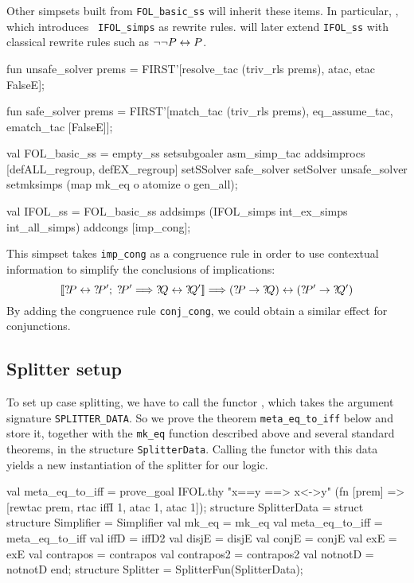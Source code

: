 Other simpsets built from \texttt{FOL_basic_ss} will inherit these items.
In particular, , which introduces {\tt
  IFOL_simps} as rewrite rules.   will later
extend \texttt{IFOL_ss} with classical rewrite rules such as $\lnot\lnot
P\leftrightarrow P$.
\begin{ttbox}
fun unsafe_solver prems = FIRST'[resolve_tac (triv_rls {\at} prems),
                                 atac, etac FalseE];

fun safe_solver prems = FIRST'[match_tac (triv_rls {\at} prems),
                               eq_assume_tac, ematch_tac [FalseE]];

val FOL_basic_ss = 
      empty_ss setsubgoaler asm_simp_tac
               addsimprocs [defALL_regroup, defEX_regroup]
               setSSolver   safe_solver
               setSolver  unsafe_solver
               setmksimps (map mk_eq o atomize o gen_all);

val IFOL_ss = 
      FOL_basic_ss addsimps (IFOL_simps {\at} 
                             int_ex_simps {\at} int_all_simps)
                   addcongs [imp_cong];
\end{ttbox}
This simpset takes \texttt{imp_cong} as a congruence rule in order to use
contextual information to simplify the conclusions of implications:
\[ \List{\Var{P}\bimp\Var{P'};\; \Var{P'} \Imp \Var{Q}\bimp\Var{Q'}} \Imp
   (\Var{P}\imp\Var{Q}) \bimp (\Var{P'}\imp\Var{Q'})
\]
By adding the congruence rule \texttt{conj_cong}, we could obtain a similar
effect for conjunctions.


\subsection{Splitter setup}

To set up case splitting, we have to call the \ML{} functor , which takes the argument signature \texttt{SPLITTER_DATA}. 
So we prove the theorem \texttt{meta_eq_to_iff} below and store it, together
with the \texttt{mk_eq} function described above and several standard
theorems, in the structure \texttt{SplitterData}. Calling the functor with
this data yields a new instantiation of the splitter for our logic.
\begin{ttbox}
val meta_eq_to_iff = prove_goal IFOL.thy "x==y ==> x<->y"
  (fn [prem] => [rewtac prem, rtac iffI 1, atac 1, atac 1]);
\ttbreak
structure SplitterData =
  struct
  structure Simplifier = Simplifier
  val mk_eq          = mk_eq
  val meta_eq_to_iff = meta_eq_to_iff
  val iffD           = iffD2
  val disjE          = disjE
  val conjE          = conjE
  val exE            = exE
  val contrapos      = contrapos
  val contrapos2     = contrapos2
  val notnotD        = notnotD
  end;
\ttbreak
structure Splitter = SplitterFun(SplitterData);
\end{ttbox}


